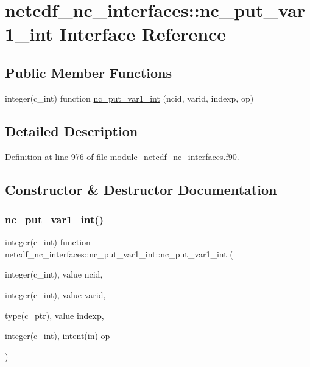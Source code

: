 \hypertarget{interfacenetcdf__nc__interfaces_1_1nc__put__var1__int}{}\section{netcdf\+\_\+nc\+\_\+interfaces\+:\+:nc\+\_\+put\+\_\+var1\+\_\+int Interface Reference}
\label{interfacenetcdf__nc__interfaces_1_1nc__put__var1__int}
\subsection*{Public Member Functions}
\begin{DoxyCompactItemize}
\item 
integer(c\+\_\+int) function \hyperlink{interfacenetcdf__nc__interfaces_1_1nc__put__var1__int_a9c578e3e950a5214f57c3a2db96a79d9}{nc\+\_\+put\+\_\+var1\+\_\+int} (ncid, varid, indexp, op)
\end{DoxyCompactItemize}


\subsection{Detailed Description}


Definition at line 976 of file module\+\_\+netcdf\+\_\+nc\+\_\+interfaces.\+f90.



\subsection{Constructor \& Destructor Documentation}
\mbox{\label{interfacenetcdf__nc__interfaces_1_1nc__put__var1__int_a9c578e3e950a5214f57c3a2db96a79d9}} 
\subsubsection{\texorpdfstring{nc\+\_\+put\+\_\+var1\+\_\+int()}{nc\_put\_var1\_int()}}
{\footnotesize\ttfamily integer(c\+\_\+int) function netcdf\+\_\+nc\+\_\+interfaces\+::nc\+\_\+put\+\_\+var1\+\_\+int\+::nc\+\_\+put\+\_\+var1\+\_\+int (\begin{DoxyParamCaption}\item[{integer(c\+\_\+int), value}]{ncid,  }\item[{integer(c\+\_\+int), value}]{varid,  }\item[{type(c\+\_\+ptr), value}]{indexp,  }\item[{integer(c\+\_\+int), intent(in)}]{op }\end{DoxyParamCaption})}



